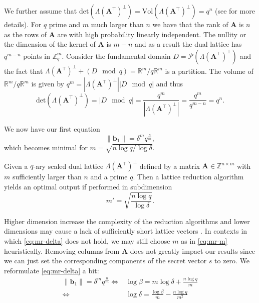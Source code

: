 We further assume that $\text{det}(\Lambda(\mathbf{A}^\intercal)^{\perp}) = \text{Vol}(\Lambda(\mathbf{A}^\intercal)^{\perp}) = q^n$ (see \cite{MR09} for more details). For $q$ prime and $m$ much larger than $n$ we have that the rank of $\mathbf{A}$ is $n$ as the rows of $\mathbf{A}$ are with high probability linearly independent. The nullity or the dimension of the kernel of $\mathbf{A}$ is $m-n$ and as a result the dual lattice has $q^{m-n}$ points in $\mathbb{Z}_q^m$. Consider the fundamental domain $D = \mathcal{P}(\Lambda(\mathbf{A}^\intercal)^{\perp})$ and the fact that $\Lambda(\mathbf{A}^\intercal)^{\perp} + (D \mod q) = \mathbb{R}^m/q\mathbb{R}^m$ is a partition. The volume of $\mathbb{R}^m/q\mathbb{R}^m$ is given by $q^m =|\Lambda(\mathbf{A}^\intercal)^{\perp}||D \mod q|$ and thus
\begin{equation}
  \text{det}(\Lambda(\mathbf{A}^\intercal)^{\perp}) = |D \mod q| = \frac{q^m}{|\Lambda(\mathbf{A}^\intercal)^{\perp}|} = \frac{q^{m}}{q^{m-n}} = q^n.
\end{equation}


We now have our first equation
\begin{equation}\label{eq:mr-delta}
  \|\mathbf{b}_1\| = \delta^m q^{\frac{n}{m}},
\end{equation}
which becomes minimal for $m = \sqrt{n \log q / \log \delta}$.
\begin{theorem}
  Given a $q$-ary scaled dual lattice  $\Lambda(\mathbf{A}^\intercal)^{\perp}$ defined by a matrix $\mathbf{A} \in \mathbb{Z}^{n \times m}$ with $m$ sufficiently larger than $n$ and a prime $q$. Then a lattice reduction algorithm yields an optimal output if performed in subdimension
  \begin{equation}
    m' = \sqrt{\frac{n \log q}{\log \delta}}. \label{eq:mr-m}
  \end{equation}
\end{theorem}

Higher dimension increase the complexity of the reduction algorithms and lower dimensions may cause a lack of sufficiently short lattice vectors \cite{MR09}. In contexts in which \cref{eq:mr-delta} does not hold, we may still choose $m$ as in \cref{eq:mr-m} heuristically. Removing columns from $\mathbf{A}$ does not greatly impact our results since we can just set the corresponding components of the secret vector $s$ to zero. We reformulate \cref{eq:mr-delta} a bit:
\begin{align}
  \|\mathbf{b}_1\| = \delta^m q^{\frac{n}{m}} \iff & \log \beta = m \log \delta + \frac{n \log q}{m}                                   \\
  \iff                                             & \log \delta = \frac{\log \beta}{m} - \frac{n \log q}{m^2} \label{eq:mr-log-delta}
\end{align}

